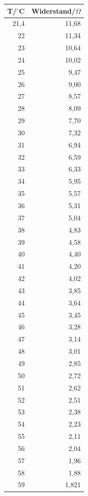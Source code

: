 \documentclass[12pt,a4paper]{article}
\begin{document}
\begin{table}[htbp]
\begin{center}
\begin{tabular}{|r|r|}
\hline
T/$^\circ$C & Widerstand/$\Omega$ \\ \hline
21,4 & 11,68 \\ \hline
22 & 11,34 \\ \hline
23 & 10,64 \\ \hline
24 & 10,02 \\ \hline
25 & 9,47 \\ \hline
26 & 9,00 \\ \hline
27 & 8,57 \\ \hline
28 & 8,09 \\ \hline
29 & 7,70 \\ \hline
30 & 7,32 \\ \hline
31 & 6,94 \\ \hline
32 & 6,59 \\ \hline
33 & 6,33 \\ \hline
34 & 5,95 \\ \hline
35 & 5,57 \\ \hline
36 & 5,31 \\ \hline
37 & 5,04 \\ \hline
38 & 4,83 \\ \hline
39 & 4,58 \\ \hline
40 & 4,40 \\ \hline
41 & 4,20 \\ \hline
42 & 4,02 \\ \hline
43 & 3,85 \\ \hline
44 & 3,64 \\ \hline
45 & 3,45 \\ \hline
46 & 3,28 \\ \hline
47 & 3,14 \\ \hline
48 & 3,01 \\ \hline
49 & 2,85 \\ \hline
50 & 2,72 \\ \hline
51 & 2,62 \\ \hline
52 & 2,51 \\ \hline
53 & 2,38 \\ \hline
54 & 2,23 \\ \hline
55 & 2,11 \\ \hline
56 & 2,04 \\ \hline
57 & 1,96 \\ \hline
58 & 1,88 \\ \hline
59 & 1,821 \\ \hline

\end{tabular}
\end{center}
\end{table}
\end{document}
